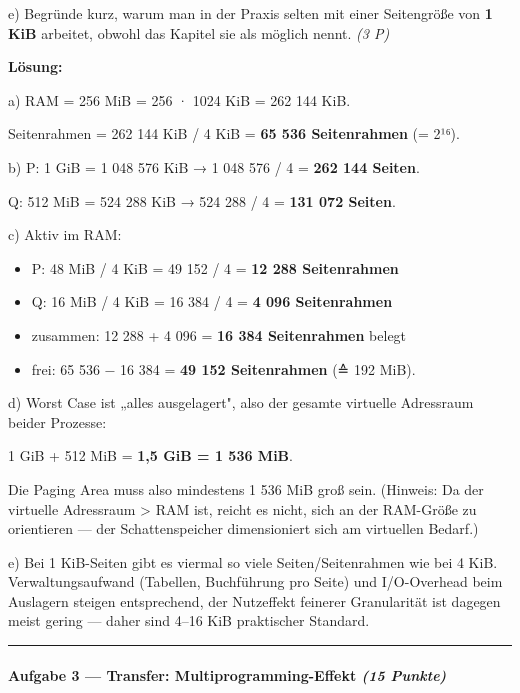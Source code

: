 \documentclass[11pt, a4paper]{article}
\begin{document}
e) Begründe kurz, warum man in der Praxis selten mit einer Seitengröße von \textbf{1 KiB} arbeitet, obwohl das Kapitel sie als möglich nennt. \textit{(3 P)}


\textbf{Lösung:}


a) RAM = 256 MiB = 256 · 1024 KiB = 262 144 KiB.

Seitenrahmen = 262 144 KiB / 4 KiB = \textbf{65 536 Seitenrahmen} (= 2¹⁶).


b) P: 1 GiB = 1 048 576 KiB → 1 048 576 / 4 = \textbf{262 144 Seiten}.

Q: 512 MiB = 524 288 KiB → 524 288 / 4 = \textbf{131 072 Seiten}.


c) Aktiv im RAM:

\begin{itemize}
  \item P: 48 MiB / 4 KiB = 49 152 / 4 = \textbf{12 288 Seitenrahmen}
  \item Q: 16 MiB / 4 KiB = 16 384 / 4 = \textbf{4 096 Seitenrahmen}
  \item zusammen: 12 288 + 4 096 = \textbf{16 384 Seitenrahmen} belegt
  \item frei: 65 536 − 16 384 = \textbf{49 152 Seitenrahmen} (≙ 192 MiB).
\end{itemize}

d) Worst Case ist „alles ausgelagert", also der gesamte virtuelle Adressraum beider Prozesse:

1 GiB + 512 MiB = \textbf{1,5 GiB = 1 536 MiB}.

Die Paging Area muss also mindestens 1 536 MiB groß sein. (Hinweis: Da der virtuelle Adressraum > RAM ist, reicht es nicht, sich an der RAM-Größe zu orientieren — der Schattenspeicher dimensioniert sich am virtuellen Bedarf.)


e) Bei 1 KiB-Seiten gibt es viermal so viele Seiten/Seitenrahmen wie bei 4 KiB. Verwaltungsaufwand (Tabellen, Buchführung pro Seite) und I/O-Overhead beim Auslagern steigen entsprechend, der Nutzeffekt feinerer Granularität ist dagegen meist gering — daher sind 4–16 KiB praktischer Standard.



\noindent\textcolor{rulegray}{\rule{\linewidth}{0.4pt}}


\paragraph{Aufgabe 3 — Transfer: Multiprogramming-Effekt \textit{(15 Punkte)}}\mbox{}\\[2pt]
\end{document}
